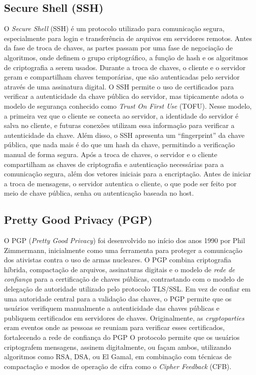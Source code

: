 \subsection{Secure Shell (SSH)}

O {\em Secure Shell} (SSH) é um protocolo utilizado para comunicação segura, especialmente para login e transferência de arquivos em servidores remotos.
Antes da fase de troca de chaves, as partes passam por uma fase de negociação de algoritmos, onde definem o grupo criptográfico, a função de hash e os algoritmos de criptografia a serem usados.
Durante a troca de chaves, o cliente e o servidor geram e compartilham chaves temporárias, que são autenticadas pelo servidor através de uma assinatura digital.
O SSH permite o uso de certificados para verificar a autenticidade da chave pública do servidor, mas tipicamente adota o modelo de segurança conhecido como {\em Trust On First Use} (TOFU).
Nesse modelo, a primeira vez que o cliente se conecta ao servidor, a identidade do servidor é salva no cliente, e futuras conexões utilizam essa informação para verificar a autenticidade da chave.
Além disso, o SSH apresenta um ``fingerprint'' da chave pública, que nada mais é do que um hash da chave, permitindo a verificação manual de forma segura.
Após a troca de chaves, o servidor e o cliente compartilham as chaves de criptografia e autenticação necessárias para a comunicação segura, além dos vetores iniciais para a encriptação.
Antes de iniciar a troca de mensagens, o servidor autentica o cliente, o que pode ser feito por meio de chave pública, senha ou autenticação baseada no host.

\subsection{Pretty Good Privacy (PGP)}

O PGP ({\em Pretty Good Privacy}) foi desenvolvido no início dos anos 1990 por Phil Zimmermann, inicialmente como uma ferramenta para proteger a comunicação dos ativistas contra o uso de armas nucleares.
O PGP combina criptografia híbrida, compactação de arquivos, assinaturas digitais e o modelo de {\em rede de confiança} para a certificação de chaves públicas, contrastando com o modelo de delegação de autoridade utilizado pelo protocolo TLS/SSL.
Em vez de confiar em uma autoridade central para a validação das chaves, o PGP permite que os usuários verifiquem manualmente a autenticidade das chaves públicas e publiquem certificados em servidores de chaves.
Originalmente, as {\em cryptoparties} eram eventos onde as pessoas se reuniam para verificar esses certificados, fortalecendo a rede de confiança do PGP
O protocolo permite que os usuários criptografem mensagens, assinem digitalmente, ou façam ambos, utilizando algoritmos como RSA, DSA, ou El Gamal, em combinação com técnicas de compactação e modos de operação de cifra como o {\em Cipher Feedback} (CFB).

